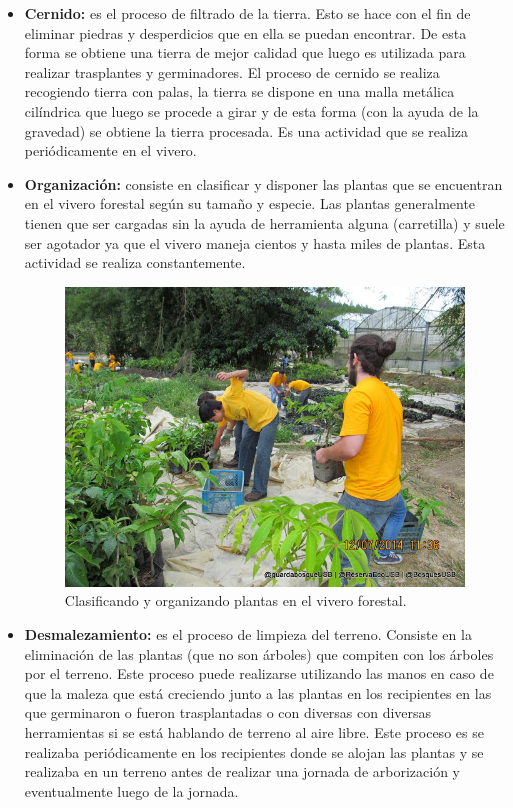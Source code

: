 \begin{itemize}
\item \textbf{Cernido:} es el proceso de filtrado de la tierra. Esto se hace con el fin de eliminar piedras y desperdicios que en ella se puedan encontrar. De esta forma se obtiene una tierra de mejor calidad que luego es utilizada para realizar trasplantes y germinadores. El proceso de cernido se realiza recogiendo tierra con palas, la tierra se dispone en una malla metálica cilíndrica que luego se procede a girar y de esta forma (con la ayuda de la gravedad) se obtiene la tierra procesada. Es una actividad que se realiza periódicamente en el vivero.

\item \textbf{Organización:} consiste en clasificar y disponer las plantas que se encuentran en el vivero forestal según su tamaño y especie. Las plantas generalmente tienen que ser cargadas sin la ayuda de herramienta alguna (carretilla) y suele ser agotador ya que el vivero maneja cientos y hasta miles de plantas. Esta actividad se realiza constantemente.

\begin{figure}[H]
    \centering
    \includegraphics[scale=0.5]{imagenes/foto4}
    \caption{Clasificando y organizando plantas en el vivero forestal.}
    \label{foto4}
\end{figure}

\item \textbf{Desmalezamiento:} es el proceso de limpieza del terreno. Consiste en la eliminación de las plantas (que no son árboles) que compiten con los árboles por el terreno. Este proceso puede realizarse utilizando las manos en caso de que la maleza que está creciendo junto a las plantas en los recipientes en las que germinaron o fueron trasplantadas o con diversas con diversas herramientas si se está hablando de terreno al aire libre. Este proceso es se realizaba periódicamente en los recipientes donde se alojan las plantas y se realizaba en un terreno antes de realizar una jornada de arborización y eventualmente luego de la jornada.

\end{itemize}

